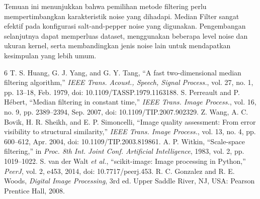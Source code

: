 \documentclass[conference,a4paper]{IEEEtran}
\begin{document}
Temuan ini menunjukkan bahwa pemilihan metode filtering perlu mempertimbangkan karakteristik noise yang dihadapi. Median Filter sangat efektif pada konfigurasi salt-and-pepper noise yang digunakan. Pengembangan selanjutnya dapat memperluas dataset, menggunakan beberapa level noise dan ukuran kernel, serta membandingkan jenis noise lain untuk mendapatkan kesimpulan yang lebih umum.

\begin{thebibliography}{6}
 T. S. Huang, G. J. Yang, and G. Y. Tang, ``A fast two-dimensional median filtering algorithm,'' \emph{IEEE Trans. Acoust., Speech, Signal Process.}, vol. 27, no. 1, pp. 13--18, Feb. 1979, doi: 10.1109/TASSP.1979.1163188.
 S. Perreault and P. Hébert, ``Median filtering in constant time,'' \emph{IEEE Trans. Image Process.}, vol. 16, no. 9, pp. 2389--2394, Sep. 2007, doi: 10.1109/TIP.2007.902329.
 Z. Wang, A. C. Bovik, H. R. Sheikh, and E. P. Simoncelli, ``Image quality assessment: From error visibility to structural similarity,'' \emph{IEEE Trans. Image Process.}, vol. 13, no. 4, pp. 600--612, Apr. 2004, doi: 10.1109/TIP.2003.819861.
 A. P. Witkin, ``Scale-space filtering,'' in \emph{Proc. 8th Int. Joint Conf. Artificial Intelligence}, 1983, vol. 2, pp. 1019--1022.
 S. van der Walt \emph{et al.}, ``scikit-image: Image processing in Python,'' \emph{PeerJ}, vol. 2, e453, 2014, doi: 10.7717/peerj.453.
 R. C. Gonzalez and R. E. Woods, \emph{Digital Image Processing}, 3rd ed. Upper Saddle River, NJ, USA: Pearson Prentice Hall, 2008.
\end{thebibliography}
\end{document}

